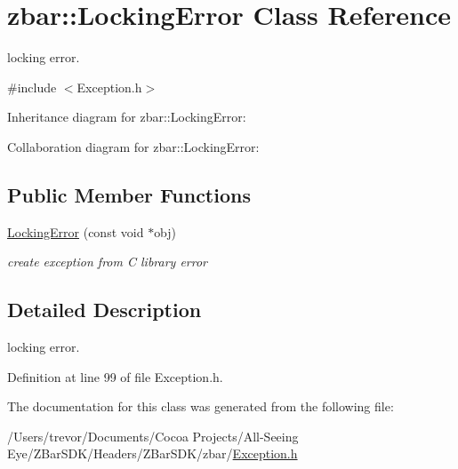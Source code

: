 \hypertarget{classzbar_1_1_locking_error}{
\section{zbar::LockingError Class Reference}
\label{classzbar_1_1_locking_error}
}


locking error.  




{\ttfamily \#include $<$Exception.h$>$}



Inheritance diagram for zbar::LockingError:


Collaboration diagram for zbar::LockingError:
\subsection*{Public Member Functions}
\begin{DoxyCompactItemize}
\item 
\hypertarget{classzbar_1_1_locking_error_ac36aa54683cd510e59b8d2f96481d49e}{
\hyperlink{classzbar_1_1_locking_error_ac36aa54683cd510e59b8d2f96481d49e}{LockingError} (const void $\ast$obj)}
\label{classzbar_1_1_locking_error_ac36aa54683cd510e59b8d2f96481d49e}

\begin{DoxyCompactList}\small\item\em create exception from C library error \end{DoxyCompactList}\end{DoxyCompactItemize}


\subsection{Detailed Description}
locking error. 

Definition at line 99 of file Exception.h.



The documentation for this class was generated from the following file:\begin{DoxyCompactItemize}
\item 
/Users/trevor/Documents/Cocoa Projects/All-\/Seeing Eye/ZBarSDK/Headers/ZBarSDK/zbar/\hyperlink{_exception_8h}{Exception.h}\end{DoxyCompactItemize}
